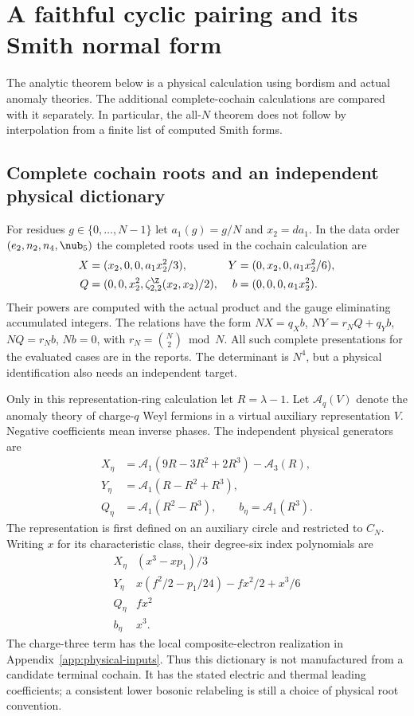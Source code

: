 \section{A faithful cyclic pairing and its Smith normal form}\label{app:cyclic-proof}
The analytic theorem below is a physical calculation using bordism and actual anomaly theories. The additional complete-cochain calculations are compared with it separately. In particular, the all-$N$ theorem does not follow by interpolation from a finite list of computed Smith forms.

\subsection{Complete cochain roots and an independent physical dictionary}
For residues $g\in\{0,\ldots,N-1\}$ let $a_1(g)=g/N$ and $x_2=da_1$. In the data order $(e_2,n_2,n_4,\nub_5)$ the completed roots used in the cochain calculation are
\begin{align}
X&=(x_2,0,0,a_1x_2^2/3),&Y&=(0,x_2,0,a_1x_2^2/6),\\
Q&=(0,0,x_2^2,\zeta^{\Z}_{2,2}(x_2,x_2)/2),&b&=(0,0,0,a_1x_2^2).
\label{v14:roots}
\end{align}
Their powers are computed with the actual product and the gauge eliminating accumulated integers. The relations have the form $NX=q_Xb$, $NY=r_NQ+q_Yb$, $NQ=r_Nb$, $Nb=0$, with $r_N=\binom N2\bmod N$. All such complete presentations for the evaluated cases are in the reports. The determinant is $N^4$, but a physical identification also needs an independent target.

Only in this representation-ring calculation let $R=\lambda-1$. Let $\mathcal A_q(V)$ denote the anomaly theory of charge-$q$ Weyl fermions in a virtual auxiliary representation $V$. Negative coefficients mean inverse phases. The independent physical generators are
\begin{align}
X_\eta&=\mathcal A_1(9R-3R^2+2R^3)-\mathcal A_3(R),\\
Y_\eta&=\mathcal A_1(R-R^2+R^3),\\
Q_\eta&=\mathcal A_1(R^2-R^3),\qquad
b_\eta=\mathcal A_1(R^3).
\label{v14:physicalcharacters}
\end{align}
The representation is first defined on an auxiliary circle and restricted to $C_N$. Writing $x$ for its characteristic class, their degree-six index polynomials are
\begin{equation}\label{v14:polydictionary}
\begin{array}{c|l}
X_\eta&(x^3-xp_1)/3\\
Y_\eta&x(f^2/2-p_1/24)-fx^2/2+x^3/6\\
Q_\eta&fx^2\\
b_\eta&x^3.
\end{array}
\end{equation}
The charge-three term has the local composite-electron realization in Appendix~\ref{app:physical-inputs}. Thus this dictionary is not manufactured from a candidate terminal cochain. It has the stated electric and thermal leading coefficients; a consistent lower bosonic relabeling is still a choice of physical root convention.


